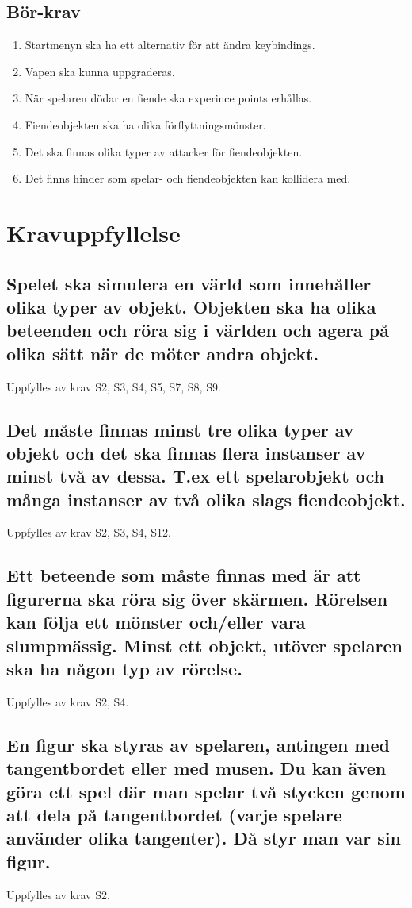 \documentclass{TDP005mall}
\begin{document}
\subsection{Bör-krav}
\begin{enumerate}[label=B\arabic*]
\item Startmenyn ska ha ett alternativ för att ändra keybindings.
\item Vapen ska kunna uppgraderas.
\item När spelaren dödar en fiende ska experince points erhållas.
\item Fiendeobjekten ska ha olika förflyttningsmönster.
\item Det ska finnas olika typer av attacker för fiendeobjekten.
\item Det finns hinder som spelar- och fiendeobjekten kan kollidera med.
\end{enumerate}

\section{Kravuppfyllelse}

\subsection{Spelet ska simulera en värld som innehåller olika typer av objekt. Objekten ska ha olika beteenden och röra sig i världen och agera på olika sätt när de möter andra objekt.}
Uppfylles av krav S2, S3, S4, S5, S7, S8, S9.
\subsection{Det måste finnas minst tre olika typer av objekt och det ska finnas flera instanser av minst två av dessa. T.ex ett spelarobjekt och många instanser av två olika slags fiendeobjekt.}
Uppfylles av krav S2, S3, S4, S12.
\subsection{Ett beteende som måste finnas med är att figurerna ska röra sig över skärmen. Rörelsen kan följa ett mönster och/eller vara slumpmässig. Minst ett objekt, utöver spelaren ska ha någon typ av rörelse.}
Uppfylles av krav S2, S4. 
\subsection{En figur ska styras av spelaren, antingen med tangentbordet eller med musen. Du kan även göra ett spel där man spelar två stycken genom att dela på tangentbordet (varje spelare använder olika tangenter). Då styr man var sin figur.}
Uppfylles av krav S2.
\end{document}
